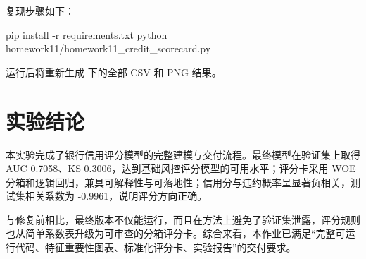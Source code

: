 \documentclass[UTF8,a4paper,12pt]{ctexart}
\begin{document}
复现步骤如下：
\begin{CodeBlock}
pip install -r requirements.txt
python homework11/homework11_credit_scorecard.py
\end{CodeBlock}

运行后将重新生成  下的全部 CSV 和 PNG 结果。

\section{实验结论}

本实验完成了银行信用评分模型的完整建模与交付流程。最终模型在验证集上取得 AUC 0.7058、KS 0.3006，达到基础风控评分模型的可用水平；评分卡采用 WOE 分箱和逻辑回归，兼具可解释性与可落地性；信用分与违约概率呈显著负相关，测试集相关系数为 -0.9961，说明评分方向正确。

与修复前相比，最终版本不仅能运行，而且在方法上避免了验证集泄露，评分规则也从简单系数表升级为可审查的分箱评分卡。综合来看，本作业已满足“完整可运行代码、特征重要性图表、标准化评分卡、实验报告”的交付要求。
\end{document}
